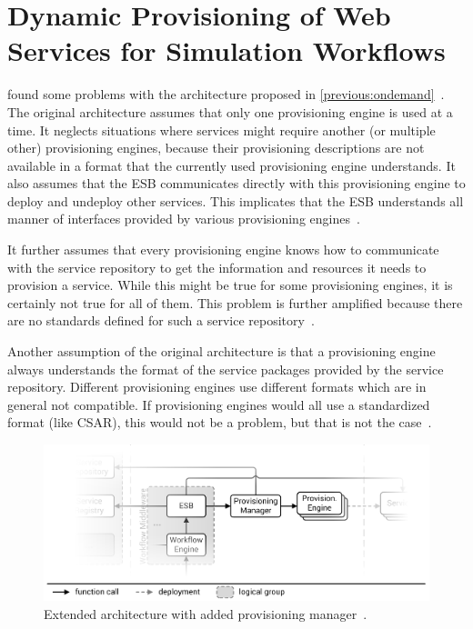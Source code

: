 \section{Dynamic Provisioning of Web Services for Simulation Workflows}
\label{previous:dynamic}

\citeauthor*{provisioning:dynamic} found some problems with the architecture proposed in \autoref{previous:ondemand}~\autocite{provisioning:dynamic}.
The original architecture assumes that only one provisioning engine is used at a time.
It neglects situations where services might require another (or multiple other) provisioning engines, because their provisioning descriptions are not available in a format that the currently used provisioning engine understands.
It also assumes that the ESB communicates directly with this provisioning engine to deploy and undeploy other services.
This implicates that the ESB understands all manner of interfaces provided by various provisioning engines~\autocite{provisioning:dynamic}.

It further assumes that every provisioning engine knows how to communicate with the service repository to get the information and resources it needs to provision a service.
While this might be true for some provisioning engines, it is certainly not true for all of them.
This problem is further amplified because there are no standards defined for such a service repository~\autocite{provisioning:dynamic}.

Another assumption of the original architecture is that a provisioning engine always understands the format of the service packages provided by the service repository.
Different provisioning engines use different formats which are in general not compatible.
If provisioning engines would all use a standardized format (like CSAR), this would not be a problem, but that is not the case~\autocite{provisioning:dynamic}.

\begin{figure}[!htbp]
	\centering
	\includegraphics[resolution=600]{previous/assets/valeri_architecture}
	\caption{Extended architecture with added provisioning manager~\autocite[based on][]{serviceselection}.}
	\label{image:valeri_architecture}
\end{figure}

